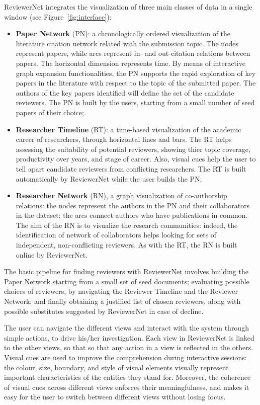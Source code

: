 ReviewerNet integrates the visualization of three main classes of data in a single window (see Figure~\ref{fig:interface}):

\begin{itemize}
\item  {\bf Paper Network} (PN): a chronologically ordered visualization of the literature citation network related with the submission topic. The nodes represent papers, while arcs represent in- and out-citation relations between papers. The horizontal dimension represents time. By means of interactive graph expansion functionalities, the PN supports the rapid exploration of key papers in the literature with respect to the topic of the submitted paper. The authors of the key papers identified will define the set of the candidate reviewers. The PN is built by the users, starting from a small number of seed papers of their choice;
\item  {\bf Researcher Timeline} (RT): a time-based visualization of the academic career of researchers, through horizontal lines and bars. The RT helps assessing the suitability of potential reviewers, showing thier topic coverage, productivity over years, and stage of career. Also, visual cues help the user to tell apart candidate reviewers from conflicting researchers. The RT is built automatically by ReviewerNet while the user builds the PN;
\item  {\bf Researcher Network} (RN), a graph visualization of co-authorship relations: the nodes represent the authors in the PN and their collaborators in the dataset; the arcs connect authors who have publications in common. The aim of the RN is to visualize the research communities: indeed, the identification of network of collaborators helps looking for sets of independent, non-conflicting reviewers. As with the RT, the RN is built online by ReviewerNet.
\end{itemize}
%
The basic pipeline for finding reviewers with ReviewerNet involves building the Paper Network starting from a small set of seed documents; evaluating possible choices of reviewers, by navigating the Reviewer Timeline and the Reviewer Network; and finally obtaining a justified list of chosen reviewers, along with possible substitutes suggested by ReviewerNet in case of decline.   

The user can navigate the different views and interact with the system through simple actions, to drive his/her investigation. Each view in ReviewerNet is linked to the other views, so that so that any action in a view is reflected in the others. Visual cues are used to improve the comprehension during interactive sessions: the colour, size, boundary, and style of visual elements visually represent important characteristics of the entities they stand for. Moreover, the coherence of visual cues across different views enforces their meaningfulness, and makes it easy for the user to switch between different views without losing focus.  

